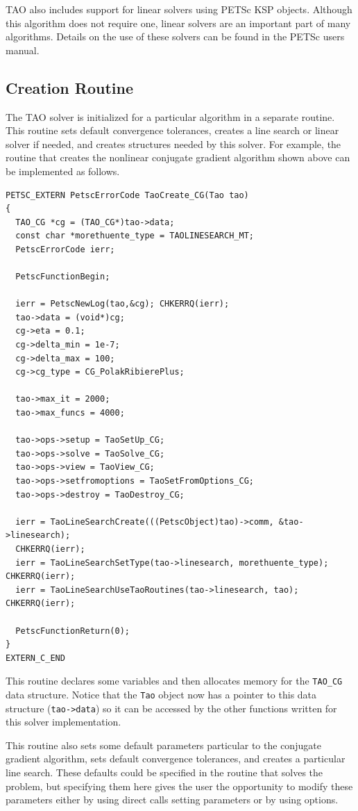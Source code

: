 \documentclass[]{book}
\begin{document}
TAO also includes support for linear solvers using PETSc KSP objects.  
Although this algorithm
does not require one, linear solvers are an important part of many
algorithms.  Details on the use of these solvers can be found in
the PETSc users manual.

\subsection{Creation Routine}
The TAO solver is initialized for a particular algorithm in a separate
routine.  This routine sets default convergence tolerances, creates a
line search or linear solver if needed, and creates structures needed
by this solver.   For example, the routine that creates the nonlinear
conjugate gradient algorithm shown above can be implemented as follows.

\begin{verbatim}
PETSC_EXTERN PetscErrorCode TaoCreate_CG(Tao tao)
{
  TAO_CG *cg = (TAO_CG*)tao->data;
  const char *morethuente_type = TAOLINESEARCH_MT;
  PetscErrorCode ierr;

  PetscFunctionBegin;

  ierr = PetscNewLog(tao,&cg); CHKERRQ(ierr);
  tao->data = (void*)cg;
  cg->eta = 0.1;
  cg->delta_min = 1e-7;
  cg->delta_max = 100;
  cg->cg_type = CG_PolakRibierePlus;

  tao->max_it = 2000;
  tao->max_funcs = 4000;

  tao->ops->setup = TaoSetUp_CG;
  tao->ops->solve = TaoSolve_CG;
  tao->ops->view = TaoView_CG;
  tao->ops->setfromoptions = TaoSetFromOptions_CG;
  tao->ops->destroy = TaoDestroy_CG;

  ierr = TaoLineSearchCreate(((PetscObject)tao)->comm, &tao->linesearch);
  CHKERRQ(ierr);
  ierr = TaoLineSearchSetType(tao->linesearch, morethuente_type); CHKERRQ(ierr);
  ierr = TaoLineSearchUseTaoRoutines(tao->linesearch, tao); CHKERRQ(ierr);

  PetscFunctionReturn(0);
}
EXTERN_C_END
\end{verbatim}

\noindent This routine declares some variables and then allocates memory for the 
{\tt TAO\_CG} data structure. Notice that the \texttt{Tao} object 
now has a pointer to this data structure (\texttt{tao->data}) so it can be 
accessed by the other functions written for this solver implementation.

This routine also sets some default parameters particular to the conjugate
gradient algorithm, sets default convergence tolerances, and creates
a particular line search.
These defaults could be specified in the routine that solves the problem,
but specifying them here gives the user the opportunity to modify these
parameters either by using direct calls setting parameters or by using options.
\end{document}
